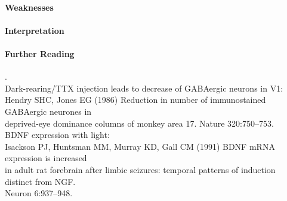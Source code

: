 \documentclass[11pt]{article}
\begin{document}
\paragraph{Weaknesses}

\paragraph{Interpretation}

\paragraph{Further Reading} \tiny{.}\\
\normalsize
Dark-rearing/TTX injection leads to decrease of GABAergic neurons in V1: \\
\hspace*{0.5in}Hendry SHC, Jones EG (1986) Reduction in number of immunostained GABAergic neurones
in \\
\hspace*{0.5in}deprived-eye dominance columns of monkey area 17. Nature 320:750–753. \\
BDNF expression with light: \\
\hspace*{0.5in} Isackson PJ, Huntsman MM, Murray KD, Gall CM (1991) BDNF mRNA expression is increased \\
\hspace*{0.5in} in adult rat forebrain after limbic seizures: temporal patterns of induction distinct from NGF.\\
\hspace*{0.5in} Neuron 6:937–948.\\
\end{document}

